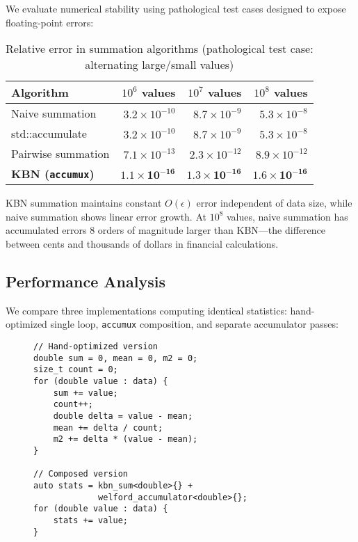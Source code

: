\documentclass[sigconf]{acmart}
\newcommand{\accumux}{\texttt{accumux}\xspace}
\begin{document}
We evaluate numerical stability using pathological test cases designed to expose floating-point errors:

\begin{table}[h]
\centering
\caption{Relative error in summation algorithms (pathological test case: alternating large/small values)}
\label{tab:accuracy}
\begin{tabular}{lrrr}
\toprule
Algorithm & $10^6$ values & $10^7$ values & $10^8$ values \\
\midrule
Naive summation & $3.2 \times 10^{-10}$ & $8.7 \times 10^{-9}$ & $5.3 \times 10^{-8}$ \\
std::accumulate & $3.2 \times 10^{-10}$ & $8.7 \times 10^{-9}$ & $5.3 \times 10^{-8}$ \\
Pairwise summation & $7.1 \times 10^{-13}$ & $2.3 \times 10^{-12}$ & $8.9 \times 10^{-12}$ \\
\textbf{KBN (\accumux)} & $\mathbf{1.1 \times 10^{-16}}$ & $\mathbf{1.3 \times 10^{-16}}$ & $\mathbf{1.6 \times 10^{-16}}$ \\
\bottomrule
\end{tabular}
\end{table}

KBN summation maintains constant $O(\epsilon)$ error independent of data size, while naive summation shows linear error growth. At $10^8$ values, naive summation has accumulated errors 8 orders of magnitude larger than KBN---the difference between cents and thousands of dollars in financial calculations.

\subsection{Performance Analysis}

We compare three implementations computing identical statistics: hand-optimized single loop, \accumux composition, and separate accumulator passes:

\begin{figure}[h]
\centering
\begin{lstlisting}[caption={Performance comparison setup},label={lst:benchmark}]
// Hand-optimized version
double sum = 0, mean = 0, m2 = 0;
size_t count = 0;
for (double value : data) {
    sum += value;
    count++;
    double delta = value - mean;
    mean += delta / count;
    m2 += delta * (value - mean);
}

// Composed version
auto stats = kbn_sum<double>{} +
             welford_accumulator<double>{};
for (double value : data) {
    stats += value;
}
\end{lstlisting}
\end{figure}
\end{document}
